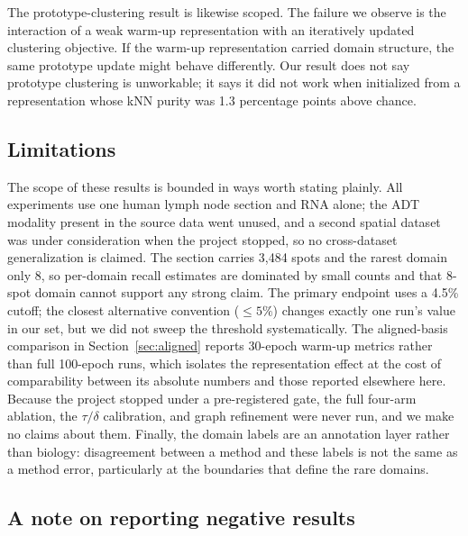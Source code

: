 \documentclass[twocolumn,10pt]{article}
\begin{document}
The prototype-clustering result is likewise scoped. The failure we observe is the interaction of a weak warm-up representation with an iteratively updated clustering objective. If the warm-up representation carried domain structure, the same prototype update might behave differently. Our result does not say prototype clustering is unworkable; it says it did not work when initialized from a representation whose kNN purity was 1.3 percentage points above chance.

\subsection{Limitations}

The scope of these results is bounded in ways worth stating plainly. All experiments use one human lymph node section and RNA alone; the ADT modality present in the source data went unused, and a second spatial dataset was under consideration when the project stopped, so no cross-dataset generalization is claimed. The section carries 3{,}484 spots and the rarest domain only 8, so per-domain recall estimates are dominated by small counts and that 8-spot domain cannot support any strong claim. The primary endpoint uses a 4.5\% cutoff; the closest alternative convention ($\leq 5\%$) changes exactly one run's value in our set, but we did not sweep the threshold systematically. The aligned-basis comparison in Section~\ref{sec:aligned} reports 30-epoch warm-up metrics rather than full 100-epoch runs, which isolates the representation effect at the cost of comparability between its absolute numbers and those reported elsewhere here. Because the project stopped under a pre-registered gate, the full four-arm ablation, the $\tau/\delta$ calibration, and graph refinement were never run, and we make no claims about them. Finally, the domain labels are an annotation layer rather than biology: disagreement between a method and these labels is not the same as a method error, particularly at the boundaries that define the rare domains.

\subsection{A note on reporting negative results}
\end{document}
